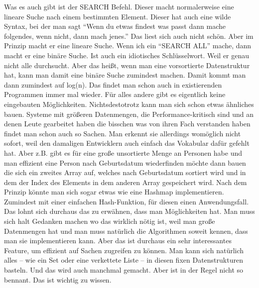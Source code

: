 {Was es auch gibt ist der SEARCH Befehl. Dieser macht normalerweise eine lineare Suche nach einem bestimmten Element. Dieser hat auch eine wilde Syntax, bei der man sagt ``Wenn du etwas findest was passt dann mache folgendes, wenn nicht, dann mach jenes.'' Das liest sich auch nicht schön. Aber im Prinzip macht er eine lineare Suche. Wenn ich ein ``SEARCH ALL'' mache, dann macht er eine binäre Suche. Ist auch ein idiotisches Schlüsselwort. Weil er genau nicht alle durchsucht. Aber das heißt, wenn man eine vorsortierte Datenstruktur hat, kann man damit eine binäre Suche zumindest machen. Damit kommt man dann zumindest auf log(n). Das findet man schon auch in existierenden Programmen immer mal wieder. Für alles andere gibt es eigentlich keine eingebauten Möglichkeiten. Nichtsdestotrotz kann man sich schon etwas ähnliches bauen. Systeme mit größeren Datenmengen, die Performance-kritisch sind und an denen Leute gearbeitet haben die bisschen was von ihren Fach verstanden haben findet man schon auch so Sachen. Man erkennt sie allerdings womöglich nicht sofort, weil den damaligen Entwicklern auch einfach das Vokabular dafür gefehlt hat. Aber z.B. gibt es für eine große unsortierte Menge an Personen habe und man effizient eine Person nach Geburtsdatum wiederfinden möchte dann bauen die sich ein zweites Array auf, welches nach Geburtsdatum sortiert wird und in dem der Index des Elements in dem anderen Array gespeichert wird. Nach dem Prinzip könnte man sich sogar etwas wie eine Hashmap implementieren. Zumindest mit einer einfachen Hash-Funktion, für diesen einen Anwendungsfall. Das lohnt sich durchaus das zu erwähnen, dass man Möglichkeiten hat. Man muss sich halt Gedanken machen wo das wirklich nötig ist, weil man große Datenmengen hat und man muss natürlich die Algorithmen soweit kennen, dass man sie implementieren kann. Aber das ist durchaus ein sehr interessantes Feature, um effizient auf Sachen zugreifen zu können. Man kann sich natürlich alles -- wie ein Set oder eine verkettete Liste -- in diesen fixen Datenstrukturen basteln. Und das wird auch manchmal gemacht. Aber ist in der Regel nicht so bennant. Das ist wichtig zu wissen.

}
